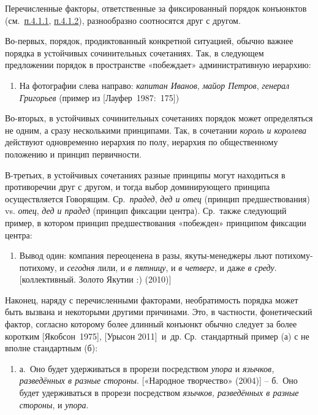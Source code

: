Перечисленные факторы, ответственные за фиксированный порядок конъюнктов
(см.~\underline{п.4.1.1}, \underline{п.4.1.2}), разнообразно соотносятся
друг с другом.

Во-первых, порядок, продиктованный конкретной ситуацией, обычно важнее
порядка в устойчивых сочинительных сочетаниях. Так, в следующем
предложении порядок в пространстве «побеждает» административную
иерархию:

\begin{enumerate}
\def\labelenumi{(\arabic{enumi})}
\setcounter{enumi}{27}
\item
  На фотографии слева направо: \emph{капитан Иванов}, \emph{майор
  Петров}, \emph{генерал Григорьев} (пример из {[}Лауфер~1987:~175{]})
\end{enumerate}

Во-вторых, в устойчивых сочинительных сочетаниях порядок может
определяться не одним, а сразу несколькими принципами. Так, в сочетании
\emph{король и королева} действуют одновременно иерархия по полу,
иерархия по общественному положению и принцип первичности.

В-третьих, в устойчивых сочетаниях разные принципы могут находиться в
противоречии друг с другом, и тогда выбор доминирующего принципа
осуществляется Говорящим. Ср.~\emph{прадед}, \emph{дед и отец} (принцип
предшествования) vs. \emph{отец}, \emph{дед и прадед} (принцип фиксации
центра). Ср.~также следующий пример, в котором принцип предшествования
«побежден» принципом фиксации центра:

\begin{enumerate}
\def\labelenumi{(\arabic{enumi})}
\setcounter{enumi}{28}
\item
  Вывод один: компания переоценена в разы, якуты-менеджеры льют
  потихому-потихому, и \emph{сегодня} лили, и \emph{в пятницу}, и
  \emph{в четверг}, и даже \emph{в среду}. {[}коллективный. Золото
  Якутии :) (2010){]}
\end{enumerate}

Наконец, наряду с перечисленными факторами, необратимость порядка может
быть вызвана и некоторыми другими причинами. Это, в частности,
фонетический фактор, согласно которому более длинный конъюнкт обычно
следует за более коротким {[}Якобсон~1975{]}, {[}Урысон 2011{]}~и~др.
Ср.~стандартный пример (а) с не вполне стандартным (б):

\begin{enumerate}
\def\labelenumi{(\arabic{enumi})}
\setcounter{enumi}{29}
\item
  а.~Оно будет удерживаться в прорези посредством \emph{упора} и
  \emph{язычков, разведённых в разные стороны}. {[}«Народное творчество»
  (2004){]} -- б.~Оно будет удерживаться в прорези посредством
  \emph{язычков, разведённых в разные стороны}, и \emph{упора}.
\end{enumerate}

